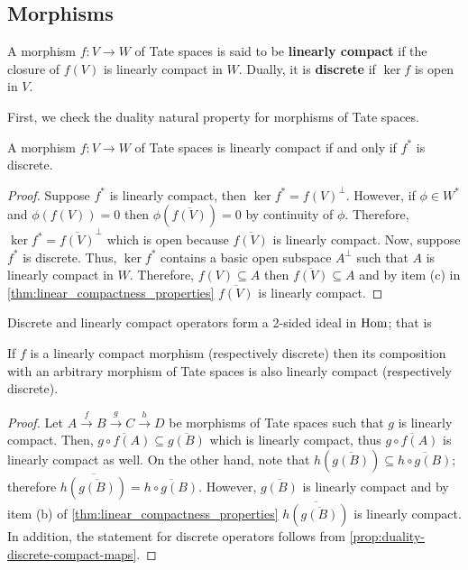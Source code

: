 \subsection*{Morphisms}
\begin{definition}\label{def:linearly-compact-and-discrete-morphisms}
	A morphism $f\colon V\to W$ of Tate spaces is said to be \textbf{linearly compact} if the closure of $f(V)$ is linearly compact in $W$. Dually, it is \textbf{discrete} if $\ker f$ is open in $V$. 
\end{definition}
First, we check the duality natural property for morphisms of Tate spaces.
\begin{proposition}\label{prop:duality-discrete-compact-maps}
	A morphism $f\colon V\to W$ of Tate spaces is linearly compact if and only if $f^{*}$ is discrete.
\end{proposition}
\begin{proof}
	Suppose $f^{*}$ is linearly compact, then $\ker f^{*} = f(V)^{\perp}$. However, if $\phi\in W^{*}$ and $\phi(f(V)) = 0$ then $\phi(\overline{f(V)}) = 0$ by continuity of $\phi$. Therefore, $\ker f^{*} = \overline{f(V)}^{\perp}$ which is open because $\overline{f(V)}$ is linearly compact. Now, suppose $f^{*}$ is discrete. Thus, $\ker f^{*}$ contains a basic open subspace $A^{\perp}$ such that $A$ is linearly compact in $W$. Therefore, $f(V)\subseteq A$ then $\overline{f(V)} \subseteq A$ and by item (c) in \cref{thm:linear_compactness_properties} $\overline{f(V)}$ is linearly compact.
\end{proof}
Discrete and linearly compact operators form a 2-sided ideal in $\operatorname{Hom}$; that is
\begin{proposition}\label{prop:compact-and-discrete-2-sided-ideal}
	If $f$ is a linearly compact morphism (respectively discrete) then its composition with an arbitrary morphism of Tate spaces is also linearly compact (respectively discrete). 
\end{proposition}
\begin{proof}
	Let $A \xrightarrow{f} B \xrightarrow{g} C \xrightarrow{h} D$ be morphisms of Tate spaces such that $g$ is linearly compact. Then, $\overline{g\circ f(A)} \subseteq \overline{g(B)}$ which is linearly compact, thus $\overline{g\circ f(A)}$ is linearly compact as well. On the other hand, note that $h(\overline{g(B)}) \subseteq \overline{h\circ g(B)}$; therefore $\overline{h(\overline{g(B)})} = \overline{h\circ g(B)}$. However, $\overline{g(B)}$ is linearly compact and by item (b) of \cref{thm:linear_compactness_properties} $\overline{h(\overline{g(B)})}$ is linearly compact. In addition, the statement for discrete operators follows from \cref{prop:duality-discrete-compact-maps}.
\end{proof}
